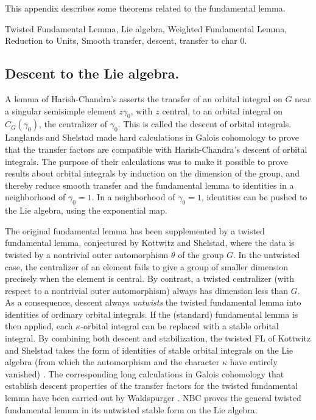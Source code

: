 \documentclass[brochure,english,12pt]{bourbaki}
\begin{document}
This appendix describes some theorems related to the fundamental lemma.

Twisted Fundamental Lemma, Lie algebra, Weighted Fundamental Lemma,
Reduction to Units, Smooth transfer, descent, transfer to char 0.

\subsection{Descent to the Lie algebra.}

A lemma of Harish-Chandra's asserts the transfer of an orbital
integral on $G$ near a singular semisimple element $z\gamma_0$, with
$z$ central, to an orbital integral on $C_G(\gamma_0)$, the
centralizer of $\gamma_0$.  This is called the descent of orbital
integrals.  Langlands and Shelstad made hard calculations in
Galois cohomology to prove that the transfer factors are compatible
with Harish-Chandra's descent of orbital integrals.  The purpose of
their calculations was to make it possible to prove results about
orbital integrals by induction on the dimension of the group, and
thereby reduce smooth transfer and the fundamental lemma to identities
in a neighborhood of $\gamma_0=1$.  In a neighborhood of $\gamma_0=1$,
identities can be pushed to the Lie algebra, using the exponential map.

The original fundamental lemma has been supplemented by a twisted
fundamental lemma, conjectured by Kottwitz and Shelstad, where the
data is twisted by a nontrivial outer automorphism $\theta$ of the
group $G$.  In the untwisted case, the centralizer of an element fails
to give a group of smaller dimension precisely when the element is
central.  By contrast, a twisted centralizer (with respect to a
nontrivial outer automorphism) always has dimension less than $G$.  As
a consequence, descent always {\it untwists} the twisted fundamental
lemma into identities of ordinary orbital integrals.  If the
(standard) fundamental lemma is then applied, each $\kappa$-orbital
integral can be replaced with a stable orbital integral.  By combining both
descent and stabilization, the twisted FL of Kottwitz and Shelstad
takes the form of identities of stable orbital integrals on the Lie
algebra (from which the automorphism and the character $\kappa$ have
entirely vanished) \cite{twisted-h}.  The corresponding long calculations in Galois
cohomology that establish descent properties of the transfer factors
for the twisted fundamental lemma have been carried out by
Waldspurger \cite{twisted-w}.  NBC proves the general twisted fundamental lemma in
its untwisted stable form on the Lie algebra.
\end{document}
